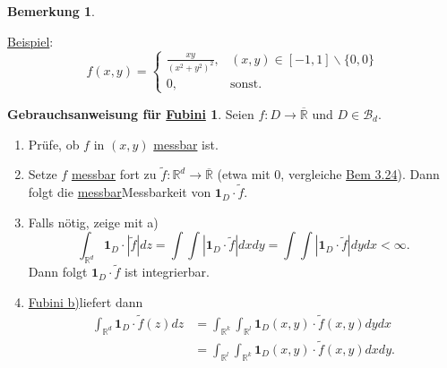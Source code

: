 \documentclass[a4paper]{report}
\newcommand{\doubleOne}{\textbf{1}}
\newcommand{\R}{\mathbb{R}}
\newcommand{\Rq}{\overline{\R}}
\newcommand{\Borel}{\mathcal{B}}
\newcommand{\Bd}{\Borel_d}
\newcommand{\jemph}{\uline}
\newcommand{\jhyperref}[2]{\hyperref[j_#1]{#2}}
\newcommand{\jlink}[1]{\jhyperref{#1}{#1}}
\newcommand{\jabb}[3]{ #1: #2 \rightarrow #3 }
\newcommand{\jlinkFubiniB}{\jhyperref{FubiniB}{Fubini b)}}
\newcommand{\jspacesmall}{\vspace{4pt}}
\theoremstyle{plain}
\theoremstyle{definition}
\newtheorem{bem}[thm]{Bemerkung}
\newtheorem*{gebrauchsanweisungFubini}{Gebrauchsanweisung für \jlink{Fubini}}
\begin{document}
{{{{\begin{bem}
\begin{enumerate}
            \jspacesmall
            
            \jemph{Beispiel}:
            \begin{displaymath}
                f(x,y) = \begin{cases}
                             \frac{xy}{(x^2+y^2)^2}, &(x,y) \in [-1,1]\backslash \{0,0\}\\
                             0, & \text{sonst}.
                         \end{cases}
            \end{displaymath}
    \end{enumerate}
\end{bem}

\begin{gebrauchsanweisungFubini}
    Seien $\jabb{f}{D}{\Rq}$ und $D\in \Bd$.
    \begin{enumerate}
        \item Prüfe, ob $f$ in $(x,y)$ \jlink{messbar} ist.
        \item Setze $f$ \jlink{messbar} fort zu $\jabb{\tilde{f}}{\R^d}{\Rq}$ (etwa mit $0$, vergleiche \jlink{Bem 3.24}). Dann folgt die \jlink{messbar}{Messbarkeit} von $\doubleOne_D\cdot \tilde{f}$.
        \item
            Falls nötig, zeige mit a)
            \begin{displaymath}
                \int_{\R^d} \doubleOne_D\cdot |\tilde{f}| dz = \int \int |\doubleOne_D \cdot \tilde{f}| dxdy = \int \int |\doubleOne_D \cdot \tilde{f}| dydx < \infty.
            \end{displaymath}
            Dann folgt $\doubleOne_D\cdot \tilde{f}$ ist integrierbar.
        \item
            \jlinkFubiniB liefert dann
            \begin{displaymath}
                \begin{split}
                    \int_{\R^d} \doubleOne_D\cdot \tilde{f}(z)dz &= \int_{\R^k}\int_{\R^l} \doubleOne_D(x,y) \cdot \tilde{f}(x,y)dydx\\
                    &= \int_{\R^l}\int_{\R^k} \doubleOne_D(x,y) \cdot \tilde{f}(x,y)dxdy.
                \end{split}
            \end{displaymath}
    \end{enumerate}
\end{gebrauchsanweisungFubini}

}}}}
\end{document}
